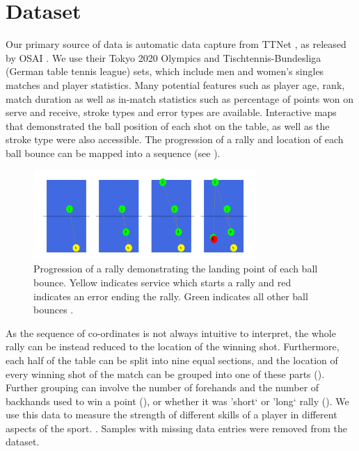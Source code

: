 \section{Dataset} \label{sec:dataset}
Our primary source of data is automatic data capture from TTNet \cite{voeikov2020ttnet}, as released by OSAI \cite{OSAI}. We use their Tokyo 2020 Olympics and Tischtennis-Bundesliga (German table tennis league) sets, which include men and women's singles matches and player statistics. Many potential features such as player age, rank, match duration as well as in-match statistics such as percentage of points won on serve and receive, stroke types and error types are available. Interactive maps that demonstrated the ball position of each shot on the table, as well as the stroke type were also accessible. The progression of a rally and location of each ball bounce can be mapped into a sequence (see ).


\begin{figure}[t]
\centering

\includegraphics[width=8.5cm]{plots/tablesequence.pdf}
\caption{Progression of a rally demonstrating the landing point of each ball bounce. Yellow indicates service which starts a rally and red indicates an error ending the rally. Green indicates all other ball bounces \cite{OSAI}.}

\label{fig:sequence}
\end{figure}

As the sequence of co-ordinates is not always intuitive to interpret, the whole rally can be instead reduced to the location of the winning shot. Furthermore, each half of the table can be split into nine equal sections, and the location of every winning shot of the match can be grouped into one of these parts (). Further grouping can involve the number of forehands and the number of backhands used to win a point (), or whether it was 'short` or 'long` rally (). We use this data to measure the strength of different skills of a player in different aspects of the sport. . Samples with missing data entries were removed from the dataset.

